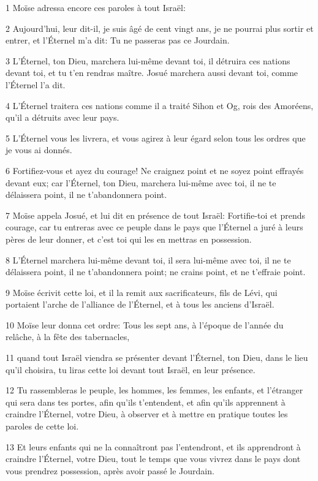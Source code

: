 \par 1 Moïse adressa encore ces paroles à tout Israël:
\par 2 Aujourd'hui, leur dit-il, je suis âgé de cent vingt ans, je ne pourrai plus sortir et entrer, et l'Éternel m'a dit: Tu ne passeras pas ce Jourdain.
\par 3 L'Éternel, ton Dieu, marchera lui-même devant toi, il détruira ces nations devant toi, et tu t'en rendras maître. Josué marchera aussi devant toi, comme l'Éternel l'a dit.
\par 4 L'Éternel traitera ces nations comme il a traité Sihon et Og, rois des Amoréens, qu'il a détruits avec leur pays.
\par 5 L'Éternel vous les livrera, et vous agirez à leur égard selon tous les ordres que je vous ai donnés.
\par 6 Fortifiez-vous et ayez du courage! Ne craignez point et ne soyez point effrayés devant eux; car l'Éternel, ton Dieu, marchera lui-même avec toi, il ne te délaissera point, il ne t'abandonnera point.
\par 7 Moïse appela Josué, et lui dit en présence de tout Israël: Fortifie-toi et prends courage, car tu entreras avec ce peuple dans le pays que l'Éternel a juré à leurs pères de leur donner, et c'est toi qui les en mettras en possession.
\par 8 L'Éternel marchera lui-même devant toi, il sera lui-même avec toi, il ne te délaissera point, il ne t'abandonnera point; ne crains point, et ne t'effraie point.
\par 9 Moïse écrivit cette loi, et il la remit aux sacrificateurs, fils de Lévi, qui portaient l'arche de l'alliance de l'Éternel, et à tous les anciens d'Israël.
\par 10 Moïse leur donna cet ordre: Tous les sept ans, à l'époque de l'année du relâche, à la fête des tabernacles,
\par 11 quand tout Israël viendra se présenter devant l'Éternel, ton Dieu, dans le lieu qu'il choisira, tu liras cette loi devant tout Israël, en leur présence.
\par 12 Tu rassembleras le peuple, les hommes, les femmes, les enfants, et l'étranger qui sera dans tes portes, afin qu'ils t'entendent, et afin qu'ils apprennent à craindre l'Éternel, votre Dieu, à observer et à mettre en pratique toutes les paroles de cette loi.
\par 13 Et leurs enfants qui ne la connaîtront pas l'entendront, et ils apprendront à craindre l'Éternel, votre Dieu, tout le temps que vous vivrez dans le pays dont vous prendrez possession, après avoir passé le Jourdain.
